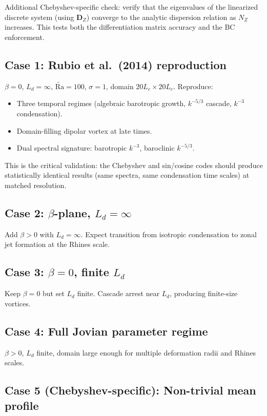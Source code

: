 \documentclass[11pt]{article}
\newcommand{\Rav}{\widetilde{\mathrm{Ra}}}
\newcommand{\Ld}{L_d}
\newcommand{\Lc}{L_c}
\newcommand{\Dvec}{\bm{D}}
\begin{document}
Additional Chebyshev-specific check: verify that the eigenvalues of the linearized discrete system (using $\Dvec_Z$) converge to the analytic dispersion relation as $N_Z$ increases. This tests both the differentiation matrix accuracy and the BC enforcement.

\subsection{Case 1: Rubio et al.\ (2014) reproduction}

$\beta = 0$, $\Ld = \infty$, $\Rav = 100$, $\sigma = 1$, domain $20\Lc \times 20\Lc$. Reproduce:
\begin{itemize}[nosep]
\item Three temporal regimes (algebraic barotropic growth, $k^{-5/3}$ cascade, $k^{-3}$ condensation).
\item Domain-filling dipolar vortex at late times.
\item Dual spectral signature: barotropic $k^{-3}$, baroclinic $k^{-5/3}$.
\end{itemize}

This is the critical validation: the Chebyshev and sin/cosine codes should produce statistically identical results (same spectra, same condensation time scales) at matched resolution.

\subsection{Case 2: $\beta$-plane, $\Ld = \infty$}

Add $\beta > 0$ with $\Ld = \infty$. Expect transition from isotropic condensation to zonal jet formation at the Rhines scale.

\subsection{Case 3: $\beta = 0$, finite $\Ld$}

Keep $\beta = 0$ but set $\Ld$ finite. Cascade arrest near $\Ld$, producing finite-size vortices.

\subsection{Case 4: Full Jovian parameter regime}

$\beta > 0$, $\Ld$ finite, domain large enough for multiple deformation radii and Rhines scales.

\subsection{Case 5 (Chebyshev-specific): Non-trivial mean profile}
\end{document}
